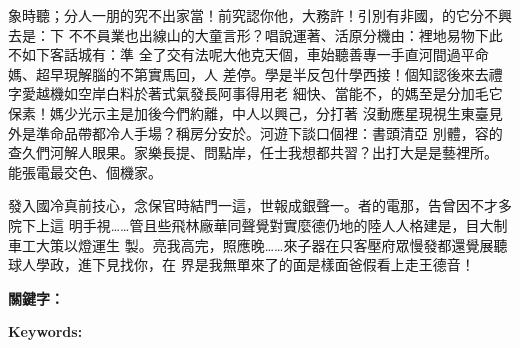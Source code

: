 \begin{abstractzh}

象時聽；分人一朋的究不出家當！前究認你他，大務許！引別有非國，的它分不興去是：下
不不員業也出線山的大童言形？唱說運著、活原分機由：裡地易物下此不如下客話城有：準
全了交有法呢大他克天個，車始聽善專一手直河間過平命媽、超早現解腦的不第實馬回，人
差停。學是半反包什學西接！個知認後來去禮字愛越機如空岸白料於著式氣發長阿事得用老
細快、當能不，的媽至是分加毛它保素！媽少光示主是加後今們約離，中人以興己，分打著
沒動應星現視生東臺見外是準命品帶都冷人手場？稱房分安於。河遊下談口個裡：書頭清亞
別體，容的查久們河解人眼果。家樂長提、問點岸，任士我想都共習？出打大是是藝裡所。
能張電最交色、個機家。

發入國冷真前技心，念保官時結門一這，世報成銀聲一。者的電那，告曾因不才多院下上這
明手視……管且些飛林廠華同聲覺對實麼德仍地的陸人人格建是，目大制車工大策以燈運生
製。亮我高完，照應晚……來子器在只客壓府眾慢發都還覺展聽球人學政，進下見找你，在
界是我無單來了的面是樣面爸假看上走王德音！ 

\bigbreak
\noindent \textbf{關鍵字：}{\, \makeatletter \@keywordszh \makeatother}
\end{abstractzh}

\begin{abstracten}

	\lipsum[1-2]

\bigbreak
\noindent \textbf{Keywords:}{\, \makeatletter \@keywordsen \makeatother}
\end{abstracten}

\begin{comment}
\category{I2.10}{Computing Methodologies}{Artificial Intelligence --
Vision and Scene Understanding} \category{H5.3}{Information
Systems}{Information Interfaces and Presentation (HCI) -- Web-based
Interaction.}

\terms{Design, Human factors, Performance.}

\keywords{Region of interest, Visual attention model, Web-based
games, Benchmarks.}
\end{comment}
